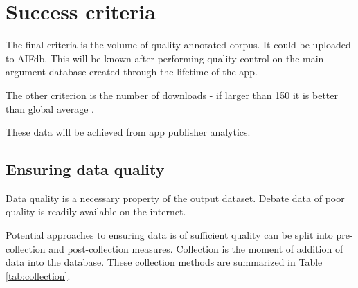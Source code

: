 \documentclass{report}
\begin{document}
\section{Success criteria}
The final criteria is the volume of quality annotated corpus. It could be uploaded to AIFdb. 
This will be known after performing quality control on the main argument database created through the lifetime of the app. 

The other criterion is the number of downloads - if larger than 150 it is better than global average \cite{noauthor_average_nodate}.

These data will be achieved from app publisher analytics.

\subsection{Ensuring data quality}
Data quality is a necessary property of the output dataset. Debate data of poor quality is readily available on the internet.

Potential approaches to ensuring data is of sufficient quality can be split into pre-collection and post-collection measures. Collection is the moment of addition of data into the database. These collection methods are summarized in Table \ref{tab:collection}.
\end{document}
